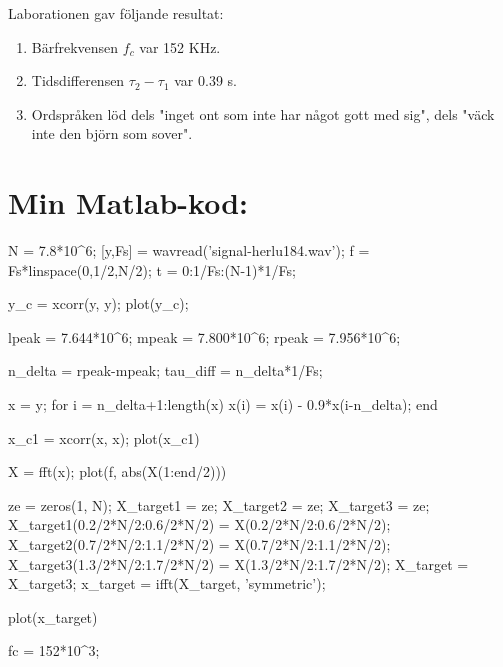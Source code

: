 \documentclass[10pt,twocolumn]{article}
\begin{document}
Laborationen gav följande resultat:
\begin{enumerate}
\item Bärfrekvensen $f_c$ var 152 KHz. 
\item Tidsdifferensen $\tau_2 - \tau_1$ var 0.39 s.
\item Ordspråken löd dels "inget ont som inte har något gott med sig", dels "väck inte den björn som sover".
\end{enumerate}

\clearpage

\section*{Min Matlab-kod:}
\begin{spverbatim}
N = 7.8*10^6;
[y,Fs] = wavread('signal-herlu184.wav');
f = Fs*linspace(0,1/2,N/2);
t = 0:1/Fs:(N-1)*1/Fs;

% 
y_c = xcorr(y, y);
plot(y_c);

lpeak = 7.644*10^6;
mpeak = 7.800*10^6;
rpeak = 7.956*10^6;

n_delta = rpeak-mpeak;
tau_diff = n_delta*1/Fs;

%
x = y;
for i = n_delta+1:length(x)
    x(i) = x(i) - 0.9*x(i-n_delta);
end

x_c1 = xcorr(x, x);
plot(x_c1)

X = fft(x);
plot(f, abs(X(1:end/2)))

ze = zeros(1, N);
X_target1 = ze;
X_target2 = ze;
X_target3 = ze;
X_target1(0.2/2*N/2:0.6/2*N/2) = X(0.2/2*N/2:0.6/2*N/2);
X_target2(0.7/2*N/2:1.1/2*N/2) = X(0.7/2*N/2:1.1/2*N/2);
X_target3(1.3/2*N/2:1.7/2*N/2) = X(1.3/2*N/2:1.7/2*N/2);
X_target = X_target3;
x_target = ifft(X_target, 'symmetric');

plot(x_target)

fc = 152*10^3;


\end{spverbatim}
\end{document}
